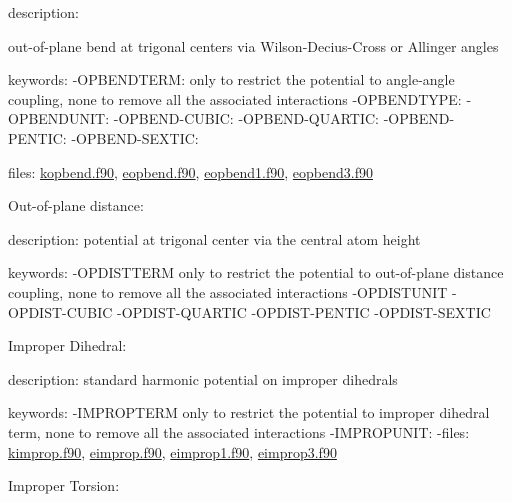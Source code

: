 \begin{DoxyItemize}
\begin{DoxyItemize}
\item description\-:
\begin{DoxyItemize}
\item out-\/of-\/plane bend at trigonal centers via Wilson-\/\-Decius-\/\-Cross or Allinger angles
\end{DoxyItemize}
\item keywords\-: -\/\-O\-P\-B\-E\-N\-D\-T\-E\-R\-M\-: only to restrict the potential to angle-\/angle coupling, none to remove all the associated interactions -\/\-O\-P\-B\-E\-N\-D\-T\-Y\-P\-E\-: -\/\-O\-P\-B\-E\-N\-D\-U\-N\-I\-T\-: -\/\-O\-P\-B\-E\-N\-D-\/\-C\-U\-B\-I\-C\-: -\/\-O\-P\-B\-E\-N\-D-\/\-Q\-U\-A\-R\-T\-I\-C\-: -\/\-O\-P\-B\-E\-N\-D-\/\-P\-E\-N\-T\-I\-C\-: -\/\-O\-P\-B\-E\-N\-D-\/\-S\-E\-X\-T\-I\-C\-:
\item files\-: \hyperlink{kopbend_8f90}{kopbend.\-f90}, \hyperlink{eopbend_8f90}{eopbend.\-f90}, \hyperlink{eopbend1_8f90}{eopbend1.\-f90}, \hyperlink{eopbend3_8f90}{eopbend3.\-f90}
\end{DoxyItemize}
\item Out-\/of-\/plane distance\-:
\begin{DoxyItemize}
\item description\-: potential at trigonal center via the central atom height
\item keywords\-: -\/\-O\-P\-D\-I\-S\-T\-T\-E\-R\-M only to restrict the potential to out-\/of-\/plane distance coupling, none to remove all the associated interactions -\/\-O\-P\-D\-I\-S\-T\-U\-N\-I\-T -\/\-O\-P\-D\-I\-S\-T-\/\-C\-U\-B\-I\-C -\/\-O\-P\-D\-I\-S\-T-\/\-Q\-U\-A\-R\-T\-I\-C -\/\-O\-P\-D\-I\-S\-T-\/\-P\-E\-N\-T\-I\-C -\/\-O\-P\-D\-I\-S\-T-\/\-S\-E\-X\-T\-I\-C
\end{DoxyItemize}
\item Improper Dihedral\-:
\begin{DoxyItemize}
\item description\-: standard harmonic potential on improper dihedrals
\item keywords\-: -\/\-I\-M\-P\-R\-O\-P\-T\-E\-R\-M only to restrict the potential to improper dihedral term, none to remove all the associated interactions -\/\-I\-M\-P\-R\-O\-P\-U\-N\-I\-T\-: -\/files\-: \hyperlink{kimprop_8f90}{kimprop.\-f90}, \hyperlink{eimprop_8f90}{eimprop.\-f90}, \hyperlink{eimprop1_8f90}{eimprop1.\-f90}, \hyperlink{eimprop3_8f90}{eimprop3.\-f90}
\end{DoxyItemize}
\item Improper Torsion\-:
\begin{DoxyItemize}

\end{DoxyItemize}
\end{DoxyItemize}
